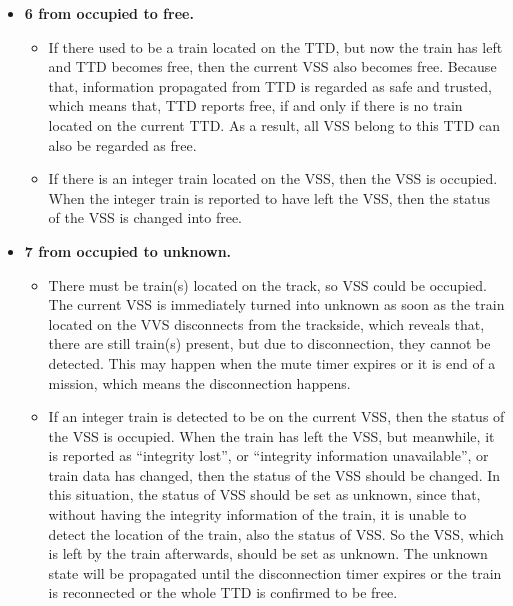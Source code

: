 \documentclass[article,dr=phil,type=drfinal,colorback,accentcolor=tud9c]{tudthesis}
\begin{document}
\begin{itemize}
  	\item \textbf{6 from occupied to free.}
  	
  	\begin{itemize}
	
	\item 
	
	If there used to be a train located on the TTD, but now the train has left and TTD becomes free, then the current VSS also becomes free. Because that, information propagated from TTD is regarded as safe and trusted, which means that, TTD reports free, if and only if there is no train located on the current TTD. As a result, all VSS belong to this TTD can also be regarded as free.
	
	\item 
	
	If there is an integer train located on the VSS, then the VSS is occupied. When the integer train is reported to have left the VSS, then the status of the VSS is changed into free.
	
    \end{itemize}    	
  	
  	\item \textbf{7 from occupied to unknown.}
  	
  	\begin{itemize}
	
	\item 
	
	There must be train(s) located on the track, so VSS could be occupied. The current VSS is immediately turned into unknown as soon as the train located on the VVS disconnects from the trackside, which reveals that, there are still train(s) present, but due to disconnection, they cannot be detected. This may happen when the mute timer expires or it is end of a mission, which means the disconnection happens.
	
	\item 
	
    If an integer train is detected to be on the current VSS, then the status of the VSS is occupied. When the train has left the VSS, but meanwhile, it is reported as ``integrity lost'', or ``integrity information unavailable'', or train data has changed, then the status of the VSS should be changed. In this situation, the status of VSS should be set as unknown, since that, without having the integrity information of the train, it is unable to detect the location of the train, also the status of VSS. So the VSS, which is left by the train afterwards, should be set as unknown. The unknown state will be propagated until the disconnection timer expires or the train is reconnected or the whole TTD is confirmed to be free.
	

\end{itemize}
\end{itemize}
\end{document}
